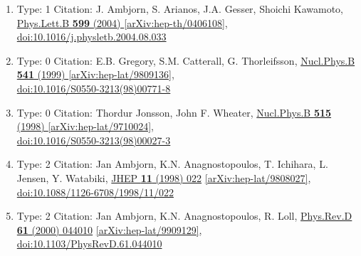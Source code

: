 \documentclass[a4paper,10pt]{article}
\begin{document}
\begin{enumerate}
\begin{enumerate}
  \item Type: 1 Citation: J. Ambjorn, S. Arianos, J.A. Gesser, Shoichi Kawamoto, \href{https://www.doi.org/10.1016/j.physletb.2004.08.033}{Phys.Lett.B {\bf 599} (2004) }  \href{https://arxiv.org/abs/hep-th/0406108}{[arXiv:hep-th/0406108]},\\\href{https://www.doi.org/10.1016/j.physletb.2004.08.033}{doi:10.1016/j.physletb.2004.08.033}
  \item Type: 0 Citation: E.B. Gregory, S.M. Catterall, G. Thorleifsson, \href{https://www.doi.org/10.1016/S0550-3213(98)00771-8}{Nucl.Phys.B {\bf 541} (1999) }  \href{https://arxiv.org/abs/hep-lat/9809136}{[arXiv:hep-lat/9809136]},\\\href{https://www.doi.org/10.1016/S0550-3213(98)00771-8}{doi:10.1016/S0550-3213(98)00771-8}
  \item Type: 0 Citation: Thordur Jonsson, John F. Wheater, \href{https://www.doi.org/10.1016/S0550-3213(98)00027-3}{Nucl.Phys.B {\bf 515} (1998) }  \href{https://arxiv.org/abs/hep-lat/9710024}{[arXiv:hep-lat/9710024]},\\\href{https://www.doi.org/10.1016/S0550-3213(98)00027-3}{doi:10.1016/S0550-3213(98)00027-3}
  \item Type: 2 Citation: Jan Ambjorn, K.N. Anagnostopoulos, T. Ichihara, L. Jensen, Y. Watabiki, \href{https://www.doi.org/10.1088/1126-6708/1998/11/022}{JHEP {\bf 11} (1998) 022}  \href{https://arxiv.org/abs/hep-lat/9808027}{[arXiv:hep-lat/9808027]},\\\href{https://www.doi.org/10.1088/1126-6708/1998/11/022}{doi:10.1088/1126-6708/1998/11/022}
  \item Type: 2 Citation: Jan Ambjorn, K.N. Anagnostopoulos, R. Loll, \href{https://www.doi.org/10.1103/PhysRevD.61.044010}{Phys.Rev.D {\bf 61} (2000) 044010}  \href{https://arxiv.org/abs/hep-lat/9909129}{[arXiv:hep-lat/9909129]},\\\href{https://www.doi.org/10.1103/PhysRevD.61.044010}{doi:10.1103/PhysRevD.61.044010}

\end{enumerate}
\end{enumerate}
\end{document}
